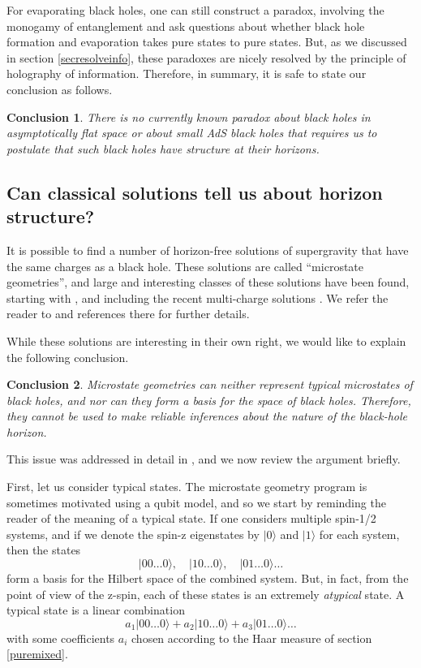 \documentclass[12pt]{article}
\newcommand{\be}{\begin{equation}}
\newcommand{\ee}{\end{equation}}
\newtheorem{lesson}{Conclusion}
\begin{document}
For evaporating black holes,  one can still construct a paradox, involving the monogamy of entanglement and ask questions about whether black hole formation and evaporation takes pure states to pure states. But, as we discussed in section \ref{secresolveinfo}, these paradoxes are nicely resolved by the principle of holography of information.  Therefore, in summary, it is safe to state our conclusion as follows.
\begin{lesson}
\label{lessonevap}
There is no currently known paradox about black holes in asymptotically flat space or about small AdS black holes that requires us to postulate that such black holes have structure at their horizons.
\end{lesson}








\subsection{Can classical solutions tell us about horizon structure? \label{seccanclass}}

It is possible to find a number of horizon-free solutions of supergravity that have the same charges as a black hole. These solutions are called ``microstate geometries'', and large and interesting classes of these solutions have been found, starting with \cite{Lunin:2001fv,Lunin:2002bj}, and including the recent multi-charge solutions \cite{Bena:2016ypk,Bena:2015bea,Bena:2017xbt}. We refer the reader to  \cite{Mathur:2005zp,Bena:2007kg,Bena:2013dka} and references there for  further details.


While these solutions are interesting in their own right, we would like to explain the following conclusion.
\begin{lesson}
\label{lessonfuzzballs}
Microstate geometries can neither represent typical microstates of black holes, and nor can they form a basis for the space of black holes. Therefore, they cannot be used to make reliable inferences about the nature of the black-hole horizon.
\end{lesson}
This issue was addressed in detail in  \cite{Raju:2018xue}, and we now review the argument briefly.

First, let us consider typical states.  The microstate geometry program is sometimes motivated using a qubit model, and so we start by reminding the reader of the meaning of a typical state. If one considers multiple spin-1/2 systems, and if we denote the spin-z eigenstates by $|0 \rangle$ and $|1 \rangle$ for each system, then the states
\be
\label{basis}
|0 0 \ldots 0 \rangle, \quad |1 0 \ldots 0 \rangle,  \quad |0 1 \ldots 0 \rangle \ldots
\ee
form a basis for the Hilbert space of the combined system.  But, in fact, from the point of view of the z-spin, each of these states is an extremely {\em atypical} state. A typical state is a linear combination
\be
a_1 |0 0 \ldots 0 \rangle + a_2 |1 0 \ldots 0 \rangle + a_3 |0 1 \ldots 0 \rangle \ldots
\ee
with some coefficients $a_i$ chosen according to the Haar measure of section \ref{puremixed}.
\end{document}
